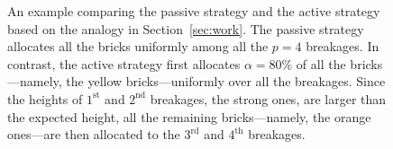 \begin{figure}[t]
	\caption{An example comparing the passive strategy and the active strategy  based on the analogy in Section~\ref{sec:work}.   The passive strategy allocates all the bricks uniformly among all the $p=4$ breakages. In contrast, the active strategy first allocates $\alpha=80\%$ of all the bricks---namely, the yellow bricks---uniformly over all the breakages. Since the heights of $1^{\mathrm{st}}$ and $2^{\mathrm{nd}}$ breakages, the strong ones, are larger than the expected height, all the remaining bricks---namely, the orange ones---are then allocated to the $3^{\mathrm{rd}}$ and $4^{\mathrm{th}}$ breakages.} 
	\label{fig:demo_fig}
\end{figure}
